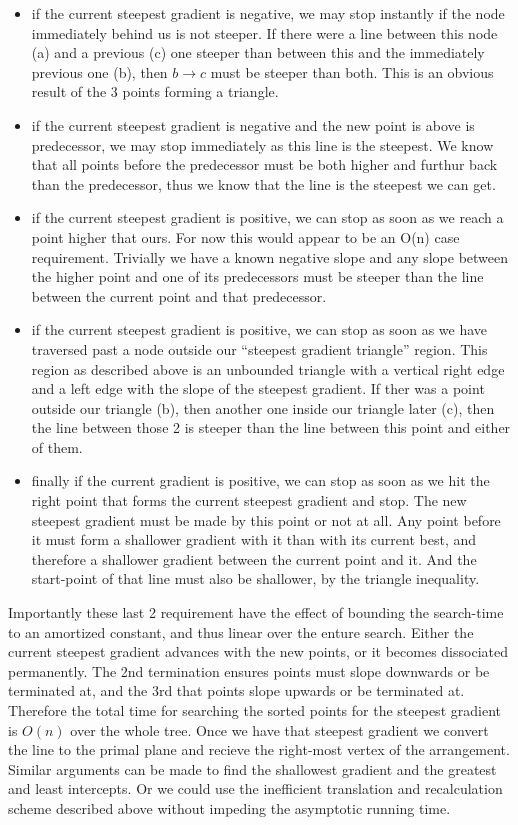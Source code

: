 \documentclass{article}
\begin{document}
\begin{itemize}
	\item if the current steepest gradient is negative, we may stop instantly if the node immediately behind us is not steeper.
		If there were a line between this node (a) and a previous (c) one steeper than between this and the immediately previous one (b), then $b \rightarrow c$ must be steeper than both.
		This is an obvious result of the 3 points forming a triangle.
	\item if the current steepest gradient is negative and the new point is above is predecessor, we may stop immediately as this line is the steepest.
		We know that all points before the predecessor must be both higher and furthur back than the predecessor, thus we know that the line is the steepest we can get.
	\item if the current steepest gradient is positive,  we can stop as soon as we reach a point higher that ours.
		For now this would appear to be an O(n) case requirement.
		Trivially we have a known negative slope and any slope between the higher point and one of its predecessors must be steeper than the line between the current point and that predecessor.
	\item if the current steepest gradient is positive, we can stop as soon as we have traversed past a node outside our ``steepest gradient triangle'' region.
		This region as described above is an unbounded triangle with a vertical right edge and a left edge with the slope of the steepest gradient.
		If ther was a point outside our triangle (b), then another one inside our triangle later (c), then the line between those 2 is steeper than the line between this point and either of them.
	\item finally if the current gradient is positive, we can stop as soon as we hit the right point that forms the current steepest gradient and stop.
		The new steepest gradient must be made by this point or not at all.
		Any point before it must form a shallower gradient with it than with its current best, and therefore a shallower gradient between the current point and it.
		And the start-point of that line must also be shallower, by the triangle inequality.
\end{itemize}

Importantly these last 2 requirement have the effect of bounding the search-time to an amortized constant, and thus linear over the enture search.
Either the current steepest gradient advances with the new points, or it becomes dissociated permanently.
The 2nd termination ensures points must slope downwards or be terminated at, and the 3rd that points slope upwards or be terminated at.
Therefore the total time for searching the sorted points for the steepest gradient is $O(n)$ over the whole tree.
Once we have that steepest gradient we convert the line to the primal plane and recieve the right-most vertex of the arrangement.
Similar arguments can be made to find the shallowest gradient and the greatest and least intercepts.
Or we could use the inefficient translation and recalculation scheme described above without impeding the asymptotic running time.
\end{document}
